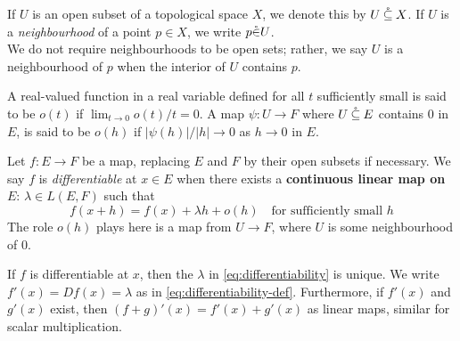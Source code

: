 \documentclass[../main-manifolds.tex]{subfiles}
\begin{document}
\newpage
{}
\begin{definition}\label{def:osub-notation}
    If $U$ is an open subset of a topological space $X$, we denote this by $U\:\mathring{\subseteq}\: X$. If $U$ is a \emph{neighbourhood} of a point $p\in X$, we write $p\mathring{\in} U$. \\
    
    We do not require neighbourhoods to be open sets; rather, we say $U$ is a neighbourhood of $p$ when the interior of $U$ contains $p$.
\end{definition}
\begin{definition}[Little $o$]\label{def:little-oh}
    A real-valued function in a real variable defined for all $t$ sufficiently small is said to be \emph{$o(t)$} if $\lim_{t\to 0}o(t)/t=0$. A map $\psi: U\to  F$ where $U\:\mathring{\subseteq}\: E$ contains $0$ in $E$, is said to be $o(h)$ if $\vert \psi(h)\vert/\vert h\vert \to 0$ as $h\to 0$ in $E$.
\end{definition}
\begin{definition}[Differentiability]\label{def:differentiability}
    Let $f: E\to F$ be a map, replacing $E$ and $F$ by their open subsets if necessary. We say $f$ is \emph{differentiable} at $x\in E$ when there exists a \textbf{continuous linear map on $E$}: $\lambda\in L(E,F)$ such that
    \begin{equation}\label{eq:differentiability}
        f(x+h) = f(x) + \lambda h + o(h)\quad\text{for sufficiently small }h
    \end{equation}
    The role $o(h)$ plays here is a map from $U\to F$, where $U$ is some neighbourhood of $0$. 
\end{definition}
\begin{wts}\label{prop:basic-properties-of-derivative}
    If $f$ is differentiable at $x$, then the $\lambda$ in \cref{eq:differentiability} is unique. We write $f'(x) = Df(x) = \lambda$ as in \cref{eq:differentiability-def}. Furthermore, if $f'(x)$ and $g'(x)$ exist, then $(f+g)'(x) = f'(x) + g'(x)$ as linear maps, similar for scalar multiplication.
\end{wts}
\end{document}
